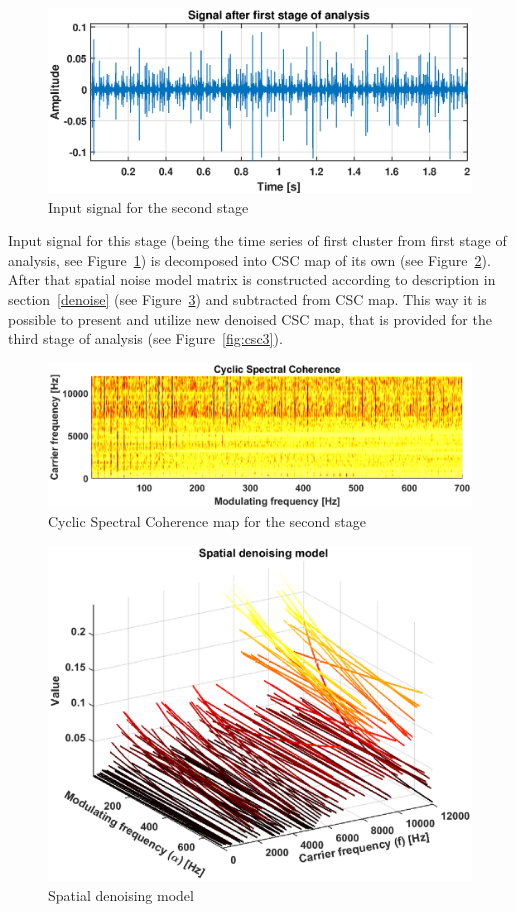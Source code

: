 \documentclass[3p, 12pt]{elsarticle} %
\begin{document}
\begin{figure}[ht!]
\centering
\includegraphics[width=.65\textwidth]{wykresy/raw2}
\caption{Input signal for the second stage}
\label{fig:raw2}
\end{figure}

Input signal for this stage (being the time series of first cluster from first stage of analysis, see Figure~\ref{fig:raw2}) is decomposed into CSC map of its own (see Figure~\ref{fig:csc2}). After that spatial noise model matrix is constructed according to description in section~\ref{denoise} (see Figure~\ref{fig:spd}) and subtracted from CSC map. This way it is possible to present and utilize new denoised CSC map, that is provided for the third stage of analysis (see Figure~\ref{fig:csc3}).

\begin{figure}[ht!]
\centering
\includegraphics[width=.8\textwidth]{wykresy/csc2}
\caption{Cyclic Spectral Coherence map for the second stage}
\label{fig:csc2}
\end{figure}

\begin{figure}[ht!]
\centering
\includegraphics[width=.75\textwidth]{wykresy/spd}
\caption{Spatial denoising model}
\label{fig:spd}
\end{figure}
\end{document}
